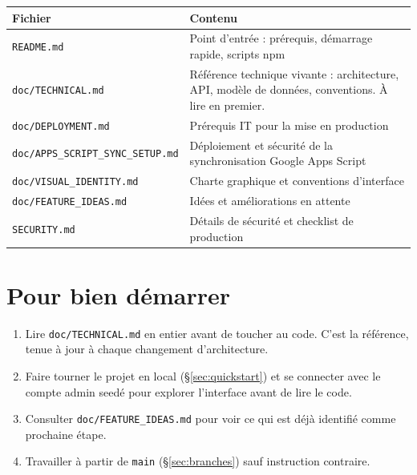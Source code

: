 \documentclass[10.5pt,a4paper]{article}
\newcommand{\mono}[1]{{\ttfamily\nolinkurl{#1}}}
\newcommand{\tablabel}[1]{\textbf{\textcolor{BrandCharcoal}{#1}}}
\begin{document}
\begin{tabularx}{\textwidth}{@{}p{}X@{}}
\toprule
\rowcolor{white}
\tablabel{Fichier} & \tablabel{Contenu} \\
\midrule
\mono{README.md} & Point d'entrée : prérequis, démarrage rapide, scripts npm \\
\mono{doc/TECHNICAL.md} & Référence technique vivante : architecture, API, modèle de données, conventions. À lire en premier. \\
\mono{doc/DEPLOYMENT.md} & Prérequis IT pour la mise en production \\
\mono{doc/APPS\_SCRIPT\_SYNC\_SETUP.md} & Déploiement et sécurité de la synchronisation Google Apps Script \\
\mono{doc/VISUAL\_IDENTITY.md} & Charte graphique et conventions d'interface \\
\mono{doc/FEATURE\_IDEAS.md} & Idées et améliorations en attente \\
\mono{SECURITY.md} & Détails de sécurité et checklist de production \\
\bottomrule
\end{tabularx}

\section{Pour bien démarrer}

\begin{enumerate}[leftmargin=1.5em, itemsep=0.3em, topsep=0.2em]
  \item Lire \mono{doc/TECHNICAL.md} en entier avant de toucher au code. C'est
    la référence, tenue à jour à chaque changement d'architecture.
  \item Faire tourner le projet en local (§\ref{sec:quickstart}) et se
    connecter avec le compte admin seedé pour explorer l'interface avant de
    lire le code.
  \item Consulter \mono{doc/FEATURE\_IDEAS.md} pour voir ce qui est déjà
    identifié comme prochaine étape.
  \item Travailler à partir de \mono{main} (§\ref{sec:branches}) sauf
    instruction contraire.
\end{enumerate}
\end{document}

